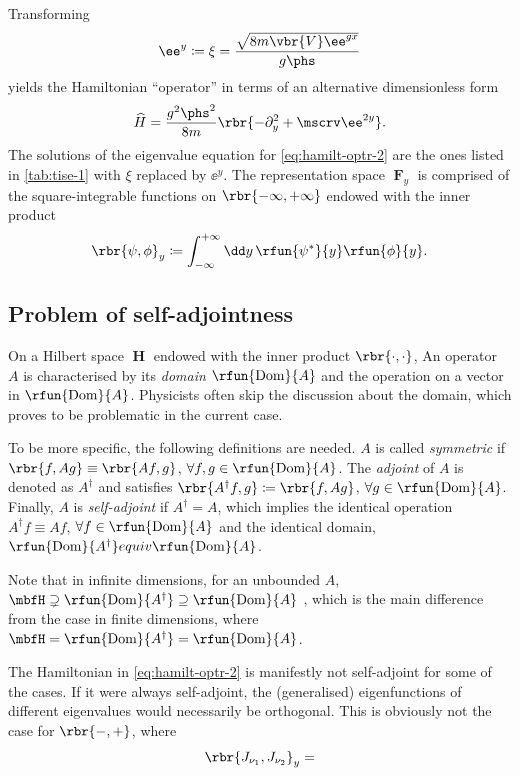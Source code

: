\documentclass[a4paper,11pt]{article}
\begin{document}
Transforming
\begin{align}
\ee^y \coloneqq \xi = \frac{\sqrt{8m\vbr{V}\ee^{g x}}}{g\phs}
\end{align}
yields the Hamiltonian ``operator'' in terms of an alternative dimensionless 
form
\begin{align}
\widehat{H} = \frac{g^2\phs^2}{8m}\rbr{-\partial_y^2 + \mscrv \ee^{2y}}.
\label{eq:hamilt-optr-2}
\end{align}
The solutions of the eigenvalue equation for \cref{eq:hamilt-optr-2} are the 
ones listed in \cref{tab:tise-1} with $\xi$ replaced by $\ee^y$. The 
representation space $\mbfF_y$ is comprised of the square-integrable functions 
on $\rbr{-\infty, +\infty}$ endowed with the inner product
\begin{align}
\rbr{\psi, \phi}_y \coloneqq \int_{-\infty}^{+\infty}\dd y\,
\rfun{\psi^*}{y}\rfun{\phi}{y}.
\end{align}

\subsection{Problem of self-adjointness}

On a Hilbert space $\mbfH$ endowed with the inner product $\rbr{\cdot,\cdot}$, 
An operator $A$ is characterised by its \emph{domain} $\rfun{\mathrm{Dom}}{A}$ 
and the operation on a vector in $\rfun{\mathrm{Dom}}{A}$. Physicists often skip 
the discussion about the domain, which proves to be problematic in the current 
case.

To be more specific, the following definitions are needed. $A$ is called 
\emph{symmetric} if $\rbr{f, A g} \equiv \rbr{A f, g}$, $\forall f, g \in 
\rfun{\mathrm{Dom}}{A}$. The \emph{adjoint} of $A$ is denoted as $A^\dagger$ and 
satisfies $\rbr{A^\dagger f, g} \coloneqq \rbr{f, A g}$, $\forall g \in 
\rfun{\mathrm{Dom}}{A}$. Finally, $A$ is \emph{self-adjoint} if $A^\dagger = A$, 
which implies the identical operation $A^\dagger f \equiv A f$, $\forall f \in 
\rfun{\mathrm{Dom}}{A}$ and the identical domain, 
$\rfun{\mathrm{Dom}}{A^\dagger} equiv \rfun{\mathrm{Dom}}{A}$.

Note that in infinite dimensions, for an unbounded $A$, $\mbfH \supsetneq 
\rfun{\mathrm{Dom}}{A^\dagger} \supseteq \rfun{\mathrm{Dom}}{A}$ \cite[ch.\ 
9]{Hall2013}, which is the main difference from the case in finite dimensions, 
where $\mbfH = \rfun{\mathrm{Dom}}{A^\dagger} = \rfun{\mathrm{Dom}}{A}$.

The Hamiltonian in \cref{eq:hamilt-optr-2} is manifestly not self-adjoint for 
some of the cases. If it were always self-adjoint, the (generalised) 
eigenfunctions of different eigenvalues would necessarily be orthogonal. This 
is obviously not the case for $\rbr{-,+}$, where
\begin{align}
\rbr{J_{\nu_1}, J_{\nu_2}}_y = 
\end{align}


\printbibliography
\end{document}
